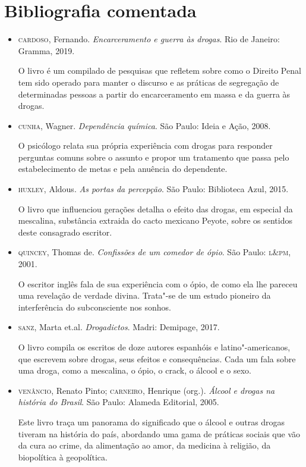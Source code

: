 \documentclass[12pt]{extarticle}
\begin{document}
\section{Bibliografia comentada}

\begin{itemize}
\item\textsc{cardoso}, Fernando. \textit{Encarceramento e guerra às drogas}. Rio de
Janeiro: Gramma, 2019.

O livro é um compilado de pesquisas que refletem sobre como o Direito
Penal tem sido operado para manter o discurso e as práticas de
segregação de determinadas pessoas a partir do encarceramento em massa e
da guerra às drogas.

\item\textsc{cunha}, Wagner. \textit{Dependência química}. São Paulo: Ideia e Ação,
2008.

O psicólogo relata sua própria experiência com drogas para responder
perguntas comuns sobre o assunto e propor um tratamento que passa pelo
estabelecimento de metas e pela anuência do dependente.

\item\textsc{huxley}, Aldous. \textit{As portas da percepção}. São Paulo: Biblioteca
Azul, 2015.

O livro que influenciou gerações detalha o efeito das drogas, em especial da mescalina, substância extraida do cacto mexicano Peyote, sobre os
sentidos deste consagrado escritor.

\item\textsc{quincey}, Thomas de. \textit{Confissões de um comedor de ópio}. São Paulo: \textsc{l\&pm}, 2001.

O escritor inglês fala de sua experiência com o ópio, de como ela lhe
pareceu uma revelação de verdade divina. Trata"-se de um estudo pioneiro
da interferência do subconsciente nos sonhos.

\item\textsc{sanz}, Marta et.al. \textit{Drogadictos}. Madri: Demipage, 2017.

O livro compila os escritos de doze autores espanhóis e
latino"-americanos, que escrevem sobre drogas, seus efeitos e
consequências. Cada um fala sobre uma droga, como a mescalina, o ópio, o
crack, o álcool e o sexo.

\item\textsc{venâncio}, Renato Pinto; \textsc{carneiro}, Henrique (org.). \textit{Álcool e drogas na história do Brasil}. São Paulo: Alameda Editorial, 2005.

Este livro traça um panorama do significado que o álcool e outras drogas
tiveram na história do país, abordando uma gama de práticas sociais que
vão da cura ao crime, da alimentação ao amor, da medicina à religião, da
biopolítica à geopolítica.
\end{itemize}
\end{document}
